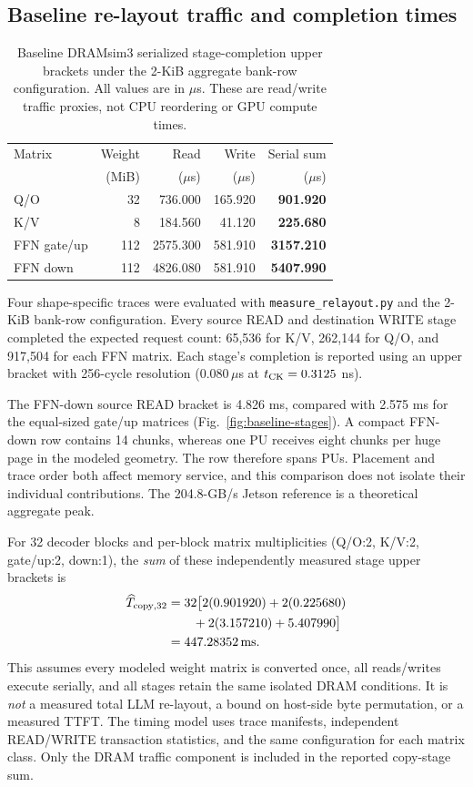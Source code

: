 \documentclass[conference,10pt]{IEEEtran}
\begin{document}
\subsection{Baseline re-layout traffic and completion times}
\begin{table}[t]
\caption{Baseline DRAMsim3 serialized stage-completion upper
brackets under the 2-KiB aggregate bank-row configuration.
All values are in $\mu$s. These are read/write traffic proxies, not CPU
reordering or GPU compute times.}
\label{tab:copy}
\centering\footnotesize
\begin{tabular}{@{}lrrrr@{}}
\toprule
Matrix & Weight & Read & Write & Serial sum \\
 & (MiB) & ($\mu$s) & ($\mu$s) & ($\mu$s) \\
\midrule
Q/O & 32 & 736.000 & 165.920 & \textbf{901.920} \\
K/V & 8 & 184.560 & 41.120 & \textbf{225.680} \\
FFN gate/up & 112 & 2575.300 & 581.910 & \textbf{3157.210} \\
FFN down & 112 & 4826.080 & 581.910 & \textbf{5407.990} \\
\bottomrule
\end{tabular}
\end{table}

Four shape-specific traces were evaluated with
\texttt{measure\_relayout.py} and the 2-KiB bank-row configuration.
Every source READ and destination WRITE stage completed the expected
request count: 65,536 for K/V, 262,144 for Q/O, and 917,504 for
each FFN matrix. Each stage's completion is reported using an
upper bracket with 256-cycle resolution
($0.080\,\mu$s at $t_{\rm CK}=0.3125$ ns).

The FFN-down source READ bracket is 4.826 ms, compared with 2.575 ms
for the equal-sized gate/up matrices (Fig.~\ref{fig:baseline-stages}). A compact FFN-down row contains
14 chunks, whereas one PU receives eight chunks per huge page in
the modeled geometry. The row therefore spans PUs. Placement and
trace order both affect memory service, and this comparison does
not isolate their individual contributions. The 204.8-GB/s Jetson
reference is a theoretical aggregate peak.

For 32 decoder blocks and per-block matrix multiplicities
(Q/O:2, K/V:2, gate/up:2, down:1), the \emph{sum} of these
independently measured stage upper brackets is
\begin{align}
\widehat T_{\rm copy,32}
&= 32\big[2(0.901920)+2(0.225680)\notag\\
&\qquad +2(3.157210)+5.407990\big]\notag\\
&=447.28352\,\mathrm{ms}.
\label{eq:copyfull}
\end{align}
This assumes every modeled weight matrix is converted once, all
reads/writes execute serially, and all stages retain the same
isolated DRAM conditions. It is \emph{not} a measured total LLM
re-layout, a bound on host-side byte permutation, or a measured TTFT.
The timing model uses trace manifests, independent READ/WRITE
transaction statistics, and the same configuration for each matrix
class. Only the DRAM traffic component is included in the reported
copy-stage sum.
\end{document}
